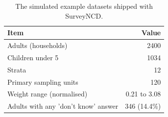 \begin{table}

\caption{\label{tab:tab_dataset}The simulated example datasets shipped with SurveyNCD.}
\centering
\begin{tabular}[t]{lr}
\toprule
Item & Value\\
\midrule
Adults (households) & 2400\\
Children under 5 & 1034\\
Strata & 12\\
Primary sampling units & 120\\
Weight range (normalised) & 0.21 to 3.08\\
Adults with any 'don't know' answer & 346 (14.4\%)\\
\bottomrule
\end{tabular}
\end{table}
